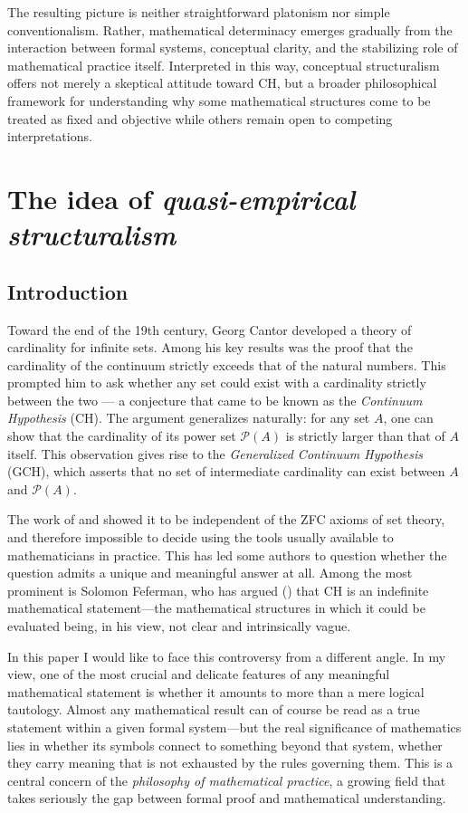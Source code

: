 \documentclass[11pt,a4paper]{book}
\theoremstyle{plain}
\begin{document}
The resulting picture is neither straightforward platonism nor simple conventionalism. Rather, mathematical determinacy emerges gradually from the interaction between formal systems, conceptual clarity, and the stabilizing role of mathematical practice itself. Interpreted in this way, conceptual structuralism offers not merely a skeptical attitude toward CH, but a broader philosophical framework for understanding why some mathematical structures come to be treated as fixed and objective while others remain open to competing interpretations.

\chapter{The idea of \textit{quasi-empirical structuralism}}
\label{chapter2}

\section{Introduction}
\label{Intro-chapter-2}

Toward the end of the 19th century, Georg Cantor developed a theory of cardinality for infinite sets. Among his key results was the proof that the cardinality of the continuum strictly exceeds that of the natural numbers. This prompted him to ask whether any set could exist with a cardinality strictly between the two --- a conjecture that came to be known as the \textit{Continuum Hypothesis} (CH). The argument generalizes naturally: for any set $A$, one can show that the cardinality of its power set $\mathcal{P}(A)$ is strictly larger than that of $A$ itself. This observation gives rise to the \textit{Generalized Continuum Hypothesis} (GCH), which asserts that no set of intermediate cardinality can exist between $A$ and $\mathcal{P}(A)$. 

The work of \textcite{Godel1940} and \textcite{Cohen1966} showed it to be independent of the ZFC axioms of set theory, and therefore impossible to decide using the tools usually available to mathematicians in practice. This has led some authors to question whether the question admits a unique and meaningful answer at all. Among the most prominent is Solomon Feferman, who has argued (\citeyear{Feferman2011a}) that $\mathrm{CH}$ is an indefinite mathematical statement---the mathematical structures in which it could be evaluated being, in his view, not clear and intrinsically vague.

In this paper I would like to face this controversy from a different angle. In my view, one of the most crucial and delicate features of any meaningful mathematical statement is whether it amounts to more than a mere logical tautology. Almost any mathematical result can of course be read as a true statement within a given formal system---but the real significance of mathematics lies in whether its symbols connect to something beyond that system, whether they carry meaning that is not exhausted by the rules governing them. This is a central concern of the \textit{philosophy of mathematical practice}, a growing field that takes seriously the gap between formal proof and mathematical understanding. 
\end{document}
